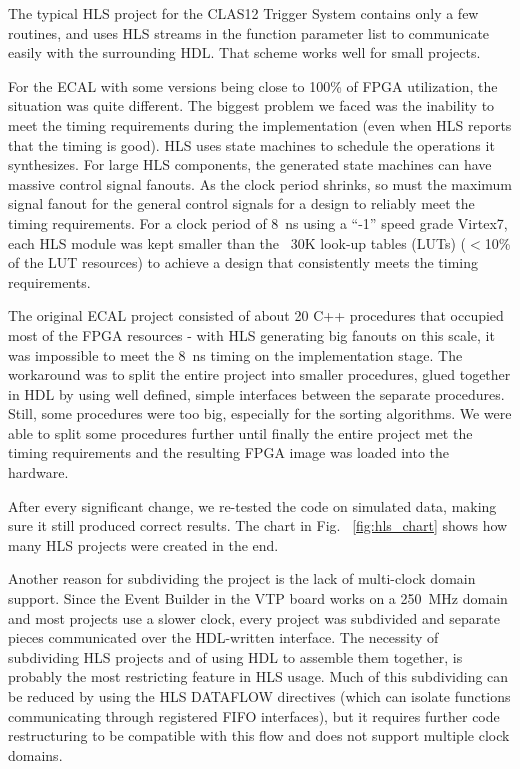 The typical HLS project for the CLAS12 Trigger System contains only a few routines, and uses HLS streams in the function parameter list to communicate easily with the surrounding HDL. That scheme works well for small projects.

For the ECAL with some versions being close to 100\% of FPGA utilization, the situation was quite different.
The biggest problem we faced was the inability to meet the timing requirements during the implementation (even when HLS reports that the timing is good). HLS uses state machines to schedule the operations it synthesizes. For large HLS components, the generated state machines can have massive control signal fanouts. As the clock period shrinks, so must the maximum signal fanout for the general control signals for a design to reliably meet the timing requirements. For a clock period of 8~ns using a ``-1'' speed grade Virtex7, each HLS module was kept smaller than the ~30K look-up tables (LUTs) ($<$10\% of the LUT resources) to achieve a design that consistently meets the timing requirements.

The original ECAL project consisted of about 20 C++ procedures that occupied most of the FPGA resources - with HLS generating big fanouts on this scale, it was impossible to meet the 8~ns timing on the implementation stage. The workaround was to split the entire project into smaller procedures, glued together in HDL by using well defined, simple interfaces between the separate procedures. Still, some procedures were too big, especially for the sorting algorithms. We were able to split some procedures further until finally the entire project met the timing requirements and the resulting FPGA image was loaded into the hardware.

After every significant change, we re-tested the code on simulated data, making sure it still produced correct results. The chart in Fig. ~\ref{fig:hls_chart} shows how many HLS projects were created in the end.

Another reason for subdividing the project is the lack of multi-clock domain support. Since the Event Builder in the VTP board works on a 250~MHz domain and most projects use a slower clock, every project was subdivided and separate pieces communicated over the HDL-written interface. The necessity of subdividing HLS projects and of using HDL to assemble them together, is probably the most restricting feature in HLS usage. Much of this subdividing can be reduced by using the HLS DATAFLOW directives (which can isolate functions communicating through registered FIFO interfaces), but it requires further code restructuring to be compatible with this flow and does not support multiple clock domains.


